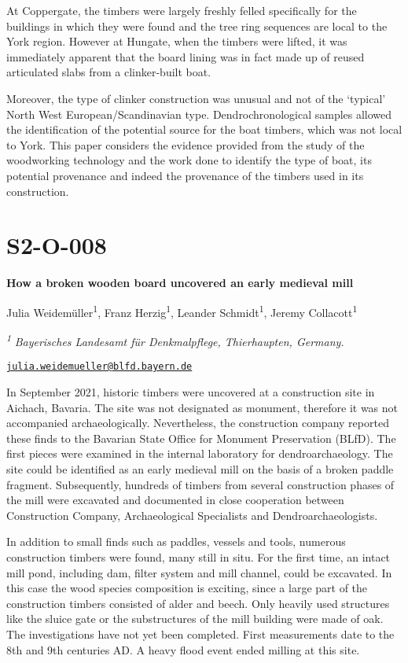 \documentclass[
]{book}
\begin{document}
At Coppergate, the timbers were largely freshly felled specifically for the buildings in which they were found and the tree ring sequences are local to the York region. However at Hungate, when the timbers were lifted, it was immediately apparent that the board lining was in fact made up of reused articulated slabs from a clinker-built boat.

Moreover, the type of clinker construction was unusual and not of the `typical' North West European/Scandinavian type. Dendrochronological samples allowed the identification of the potential source for the boat timbers, which was not local to York. This paper considers the evidence provided from the study of the woodworking technology and the work done to identify the type of boat, its potential provenance and indeed the provenance of the timbers used in its construction.

\hypertarget{s2-o-008}{%
\section*{S2-O-008}\label{s2-o-008}}

\textbf{How a broken wooden board uncovered an early medieval mill}

Julia Weidemüller\textsuperscript{1}, Franz Herzig\textsuperscript{1}, Leander Schmidt\textsuperscript{1}, Jeremy Collacott\textsuperscript{1}

\textsuperscript{\emph{1}} \emph{Bayerisches Landesamt für Denkmalpflege, Thierhaupten, Germany.}

\href{mailto:julia.weidemueller@blfd.bayern.de}{\nolinkurl{julia.weidemueller@blfd.bayern.de}}

In September 2021, historic timbers were uncovered at a construction site in Aichach, Bavaria. The site was not designated as monument, therefore it was not accompanied archaeologically. Nevertheless, the construction company reported these finds to the Bavarian State Office for Monument Preservation (BLfD). The first pieces were examined in the internal laboratory for dendroarchaeology. The site could be identified as an early medieval mill on the basis of a broken paddle fragment. Subsequently, hundreds of timbers from several construction phases of the mill were excavated and documented in close cooperation between Construction Company, Archaeological Specialists and Dendroarchaeologists.

In addition to small finds such as paddles, vessels and tools, numerous construction timbers were found, many still in situ. For the first time, an intact mill pond, including dam, filter system and mill channel, could be excavated. In this case the wood species composition is exciting, since a large part of the construction timbers consisted of alder and beech. Only heavily used structures like the sluice gate or the substructures of the mill building were made of oak. The investigations have not yet been completed. First measurements date to the 8th and 9th centuries AD. A heavy flood event ended milling at this site.
\end{document}

